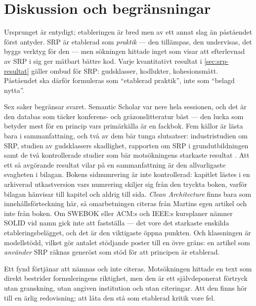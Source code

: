 \section{Diskussion och begränsningar}
\label{sec:srp-diskussion}

Ursprunget är entydigt; etableringen är bred men av ett annat slag än
påståendet först antyder.  SRP är etablerad som \emph{praktik} --- den
tillämpas, den undervisas, det byggs verktyg för den --- men sökningen
hittade inget som visar att efterlevnad av SRP i sig ger mätbart bättre
kod.  Varje kvantitativt resultat i \cref{sec:srp-resultat} gäller
ombud för SRP: gudsklasser,
kodlukter, kohesionsmått.  Påståendet ska därför formuleras som
\enquote{etablerad praktik}, inte som \enquote{belagd nytta}.

Sex saker begränsar svaret.  Semantic Scholar var nere hela sessionen, och
det är den databas som täcker konferens- och gråzonslitteratur bäst ---
den lucka som betyder mest för en princip vars primärkälla är en fackbok.
Fem källor är lästa bara i sammanfattning, och två av dem bär tunga
slutsatser: industristudien om SRP\autocite{Ampatzoglou2019Applying},
studien av gudsklassers skadlighet\autocite{Olbrich2010Areall},
rapporten om SRP i grundutbildningen\autocite{Cabezas2020Using} samt de
två kontrollerade studier som bär motsökningens starkaste resultat
\autocite{Sjoberg2013Quantifying,ElEmam2001Confounding}.  Att ett så
avgörande resultat vilar på en sammanfattning är den allvarligaste
svagheten i bilagan.  Bokens sidnumrering är
inte kontrollerad: kapitlet lästes i en arkiverad utkastversion vars
numrering skiljer sig från den tryckta boken, varför bilagan hänvisar
till kapitel och aldrig till sida.  \emph{Clean
Architecture}\autocite{Martin2017Clean} finns bara
som innehållsförteckning här, så omarbetningen citeras från Martins egen
artikel och inte från boken.  Om SWEBOK eller ACM:s och IEEE:s
kursplaner nämner SOLID vid namn gick inte att fastställa --- det vore
det starkaste enskilda etableringsbelägget, och det är den viktigaste
öppna punkten.  Och klassningen är modellstödd, vilket gör antalet
stödjande poster till en övre gräns: en artikel som \emph{använder} SRP
räknas generöst som stöd för att principen är etablerad.

Ett fynd förtjänar att nämnas och inte citeras.  Motsökningen hittade en
text som direkt bestrider formuleringens riktighet, men den är ett
självdeponerat förtryck utan granskning, utan angiven institution och utan
citeringar.  Att den finns hör till en ärlig redovisning; att låta den stå
som etablerad kritik vore fel.

